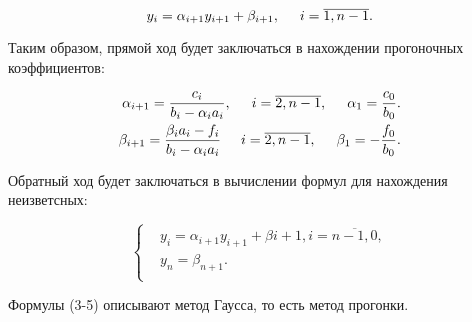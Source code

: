 \documentclass[a4paper,12pt]{article}
\begin{document}
\begin{equation*}
  y_i = \alpha_{i+1} y_{i+1} + \beta_{i+1}, \hspace{0.5cm} i = \overline{1, n- 1}.
\end{equation*}

Таким образом, прямой ход будет заключаться в нахождении прогоночных коэффициентов:

\begin{align}
  \alpha_{i + 1} = \frac{c_i}{b_i - \alpha_i a_i}, \hspace{0.5cm} i = \overline{2, n - 1}, \hspace{0.5cm} \alpha_1 = \frac{c_0}{b_0}. \\
  \beta_{i + 1} = \frac{\beta_i a_i - f_i}{b_i - \alpha_i a_i}  \hspace{0.5cm} i = \overline{2, n - 1}, \hspace{0.5cm} \beta_1 = -\frac{f_0}{b_0}. 
\end{align}

Обратный ход будет заключаться в вычислении формул для нахождения неизветсных:

\begin{equation}
  \begin{cases}
    &y_i = \alpha_{i+1} y_{i+1} + \beta{i+1}, i = \overline{n - 1, 0},\\
    &y_n = \beta_{n+1}.\\ 
  \end{cases}
\end{equation}
\newpage

Формулы (3-5) описывают метод Гаусса, то есть метод прогонки.
\end{document}
